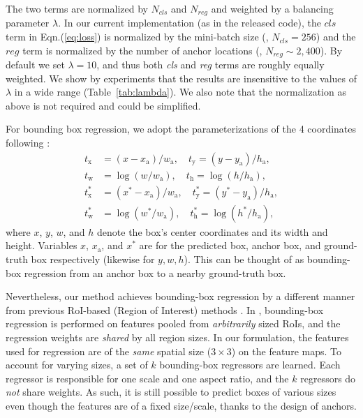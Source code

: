 \documentclass[10pt,journal,cspaper,compsoc]{IEEEtran}
\def\cls{\mathit{cls}}
\def\reg{\mathit{reg}}
\begin{document}
The two terms are normalized by $N_{\cls}$ and $N_{\reg}$ and weighted by a balancing parameter $\lambda$. In our current implementation (as in the released code), the $cls$ term in Eqn.(\ref{eq:loss}) is normalized by the mini-batch size (\ie, $N_{\cls}=256$) and the $reg$ term is normalized by the number of anchor locations (\ie, $N_{\reg}\sim2,400$). By default we set $\lambda=10$, and thus both \emph{cls} and \emph{reg} terms are roughly equally weighted. We show by experiments that the results are insensitive to the values of $\lambda$ in a wide range (Table~\ref{tab:lambda}).
We also note that the normalization as above is not required and could be simplified.

For bounding box regression, we adopt the parameterizations of the 4 coordinates following \cite{Girshick2014}:
\begin{equation}
\begin{aligned}
t_{\textrm{x}} &=  (x - x_{\textrm{a}})/w_{\textrm{a}},\quad
t_{\textrm{y}} = (y - y_{\textrm{a}})/h_{\textrm{a}},\\
t_{\textrm{w}} &= \log(w / w_{\textrm{a}}), \quad
t_{\textrm{h}} = \log(h / h_{\textrm{a}}),\\
t^{*}_{\textrm{x}} &=  (x^{*} - x_{\textrm{a}})/w_{\textrm{a}},\quad
t^{*}_{\textrm{y}} = (y^{*} - y_{\textrm{a}})/h_{\textrm{a}},\\
t^{*}_{\textrm{w}} &= \log(w^{*} / w_{\textrm{a}}),\quad
t^{*}_{\textrm{h}} = \log(h^{*} / h_{\textrm{a}}),
\end{aligned}
\end{equation}
where $x$, $y$, $w$, and $h$ denote the box's center coordinates and its width and height.
Variables $x$, $x_{\textrm{a}}$, and $x^{*}$ are for the predicted box, anchor box, and ground-truth box respectively (likewise for $y, w, h$). This can be thought of as bounding-box regression from an anchor box to a nearby ground-truth box.

Nevertheless, our method achieves bounding-box regression by a different manner from previous RoI-based (Region of Interest) methods \cite{He2014,Girshick2015a}.
In \cite{He2014,Girshick2015a}, bounding-box regression is performed on features pooled from \emph{arbitrarily} sized RoIs, and the regression weights are \emph{shared} by all region sizes. In our formulation, the features used for regression are of the \emph{same} spatial size ($3 \times 3$) on the feature maps. To account for varying sizes, a set of $k$ bounding-box regressors are learned. Each regressor is responsible for one scale and one aspect ratio, and the $k$ regressors do \emph{not} share weights. As such, it is still possible to predict boxes of various sizes even though the features are of a fixed size/scale, thanks to the design of anchors.
\end{document}
